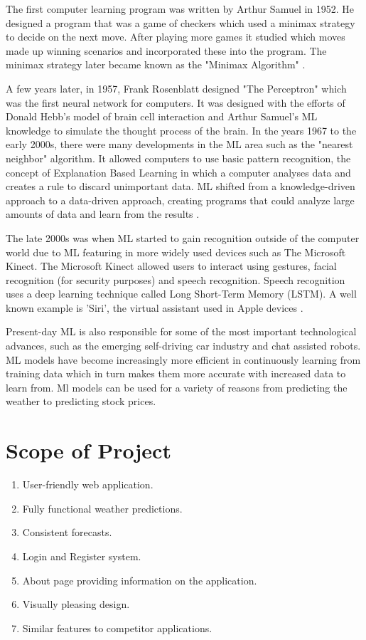 The first computer learning program was written by Arthur Samuel in 1952. He designed a program that was a game of checkers which used a minimax strategy to decide on the next move. After playing more games it studied which moves made up winning scenarios and incorporated these into the program. The minimax strategy later became known as the "Minimax Algorithm" \cite{MiniMax}.

A few years later, in 1957, Frank Rosenblatt designed "The Perceptron" which was the first neural network for computers. It was designed with the efforts of Donald Hebb's model of brain cell interaction and Arthur Samuel's ML knowledge to simulate the thought process of the brain. In the years 1967 to the early 2000s, there were many developments in the ML area such as the "nearest neighbor" algorithm. It allowed computers to use basic pattern recognition, the concept of Explanation Based Learning in which a computer analyses data and creates a rule to discard unimportant data. ML shifted from a knowledge-driven approach to a data-driven approach, creating programs that could analyze large amounts of data and learn from the results \cite{MLAlgorithmsHistory}.

The late 2000s was when ML started to gain recognition outside of the computer world due to ML featuring in more widely used devices such as The Microsoft Kinect. The Microsoft Kinect allowed users to interact using gestures, facial recognition (for security purposes) and speech recognition. Speech recognition uses a deep learning technique called Long Short-Term Memory (LSTM). A well known example is 'Siri', the virtual assistant used in Apple devices \cite{MLAlgorithmsHistory}.

Present-day ML is also responsible for some of the most important technological advances, such as the emerging self-driving car industry and chat assisted robots. ML models have become increasingly more efficient in continuously learning from training data which in turn makes them more accurate with increased data to learn from. Ml models can be used for a variety of reasons from predicting the weather to predicting stock prices.
\newpage
\section{Scope of Project}
\begin{enumerate}
\item User-friendly web application.
\item Fully functional weather predictions.
\item Consistent forecasts.
\item Login and Register system.
\item About page providing information on the application.
\item Visually pleasing design.
\item Similar features to competitor applications.
\end{enumerate}

